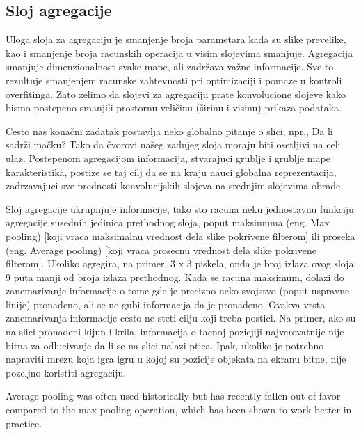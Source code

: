 \documentclass[a4paper]{article}
\begin{document}
\newpage


\subsection{Sloj agregacije}


Uloga sloja za agregaciju je smanjenje broja parametara kada su slike prevelike, kao i smanjenje broja racunskih operacija u visim slojevima smanjuje. Agregacija smanjuje dimenzionalnost svake mape, ali zadržava važne informacije. Sve to rezultuje smanjenjem racunske zahtevnosti pri optimizaciji i pomaze u kontroli overfitinga. Zato zelimo da slojevi za agregaciju prate konvolucione slojeve kako bismo postepeno smanjili prostornu veličinu (širinu i visinu) prikaza podataka.

Cesto nas konačni zadatak postavlja neko globalno pitanje o slici, npr., Da li sadrži mačku? Tako da čvorovi našeg zadnjeg sloja moraju biti osetljivi na celi ulaz. Postepenom agregacijom informacija, stvarajuci grublje i grublje mape karakteristika, postize se taj cilj da se na kraju nauci globalna reprezentacija, zadrzavajuci sve prednosti konvolucijskih slojeva na srednjim slojevima obrade.

Sloj agregacije ukrupnjuje informacije, tako sto racuna neku jednostavnu funkciju agregacije susednih jedinica prethodnog sloja, poput maksimuma (eng. Max pooling) [koji vraca maksimalnu vrednost dela slike pokrivene filterom] ili proseka (eng. Average pooling) [koji vraca prosecnu vrednost dela slike pokrivene filterom]. Ukoliko agregira, na primer, 3 x 3 piskela, onda je broj izlaza ovog sloja 9 puta manji od broja izlaza prethodnog. Kada se racuna maksimum, dolazi do zanemarivanje informacije o tome gde je precizno neko svojstvo (poput uspravne linije) pronadeno, ali se ne gubi informacija da je pronadeno. Ovakva vrsta zanemarivanja informacije cesto ne steti cilju koji treba postici. Na primer, ako su na slici pronadeni kljun i krila, informacija o tacnoj pozicjiji najverovatnije nije bitna za odlucivanje da li se na slici nalazi ptica. Ipak, ukoliko je potrebno napraviti mrezu koja igra igru u kojoj su pozicije objekata na ekranu bitne, nije pozeljno koristiti agregaciju.

 Average pooling was often used historically but has recently fallen out of favor compared to the max pooling operation, which has been shown to work better in practice.
 
\end{document}
